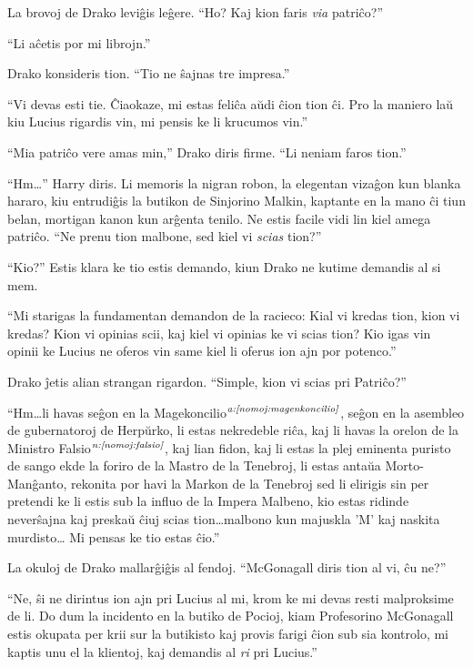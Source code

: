 La brovoj de Drako leviĝis leĝere. ``Ho? Kaj kion faris \emph{via} patriĉo?''

``Li aĉetis por mi librojn.''

Drako konsideris tion. ``Tio ne ŝajnas tre impresa.''

``Vi devas esti tie. Ĉiaokaze, mi estas feliĉa aŭdi ĉion tion ĉi. Pro la
maniero laŭ kiu Lucius rigardis vin, mi pensis ke li krucumos
vin.''

``Mia patriĉo vere amas min,'' Drako diris firme. ``Li neniam faros tion.''

``Hm\ldots'' Harry diris. Li memoris la nigran robon, la elegentan
vizaĝon kun blanka hararo, kiu entrudiĝis la butikon de Sinjorino
Malkin, kaptante en la mano ĉi tiun belan, mortigan kanon kun arĝenta
tenilo. Ne estis facile vidi lin kiel amega patriĉo. ``Ne prenu
tion malbone, sed kiel vi \emph{scias} tion?''

``Kio?'' Estis klara ke tio estis demando, kiun Drako ne kutime
demandis al si mem.

``Mi starigas la fundamentan demandon de la racieco: Kial vi kredas
tion, kion vi kredas? Kion vi opinias scii, kaj kiel vi opinias ke vi
scias tion? Kio igas vin opinii ke Lucius ne oferos vin same kiel li
oferus ion ajn por potenco.''

Drako ĵetis alian strangan rigardon. ``Simple, kion vi scias pri
Patriĉo?''

``Hm\ldots li havas seĝon en la Magekoncilio$^{\textit{a:\ref{nomoj:magenkoncilio}}}$,
seĝon en la asembleo de gubernatoroj de Herpŭrko, li estas nekredeble
riĉa, kaj li havas la orelon de la Ministro
Falsio$^{\textit{n:\ref{nomoj:falsio}}}$, kaj lian fidon, kaj li estas la plej
eminenta puristo de sango ekde la foriro de la Mastro de la
Tenebroj, li estas antaŭa Morto-Manĝanto, rekonita por havi la Markon
de la Tenebroj sed li elirigis sin per pretendi ke li estis sub la
influo de la Impera Malbeno, kio estas ridinde neverŝajna kaj preskaŭ
ĉiuj scias tion\ldots malbono kun majuskla 'M' kaj naskita murdisto\ldots
Mi pensas ke tio estas ĉio.''

La okuloj de Drako mallarĝiĝis al fendoj. ``McGonagall diris tion al vi,
ĉu ne?''

``Ne, ŝi ne dirintus ion ajn pri Lucius al mi, krom ke mi devas resti
malproksime de li. Do dum la incidento en la butiko de Pocioj, kiam
Profesorino McGonagall estis okupata per krii sur la butikisto kaj
provis farigi ĉion sub sia kontrolo, mi kaptis unu el la klientoj, kaj
demandis al \emph{ri} pri Lucius.''

